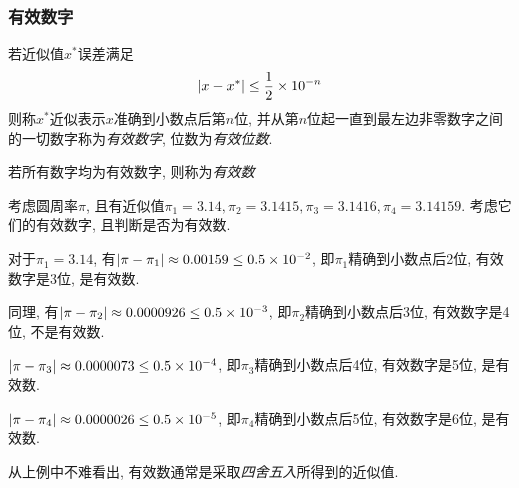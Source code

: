 \subsubsection{有效数字}

\begin{definition}
    若近似值$x^*$误差满足
    \begin{equation*}
        \abs{x-x^*}\le\frac{1}{2}\times10^{-n}
    \end{equation*}
    则称$x^*$近似表示$x$准确到小数点后第$n$位, 并从第$n$位起一直到最左边非零数字之间的一切数字称为\emph{有效数字}, 位数为\emph{有效位数}.

    若所有数字均为有效数字, 则称为\emph{有效数}
\end{definition}

\begin{example}
    考虑圆周率$\pi$, 且有近似值$\pi_1=3.14, \pi_2=3.1415, \pi_3=3.1416, \pi_4=3.14159$. 考虑它们的有效数字, 且判断是否为有效数.
\end{example}

\begin{solution}
    对于$\pi_1=3.14$, 有$\abs{\pi-\pi_1}\approx0.00159\le0.5\times10^{-2}$, 即$\pi_1$精确到小数点后2位, 有效数字是3位, 是有效数.

    同理, 有$\abs{\pi-\pi_2}\approx0.0000926\le0.5\times10^{-3}$, 即$\pi_2$精确到小数点后3位, 有效数字是4位, 不是有效数.

    $\abs{\pi-\pi_3}\approx0.0000073\le0.5\times10^{-4}$, 即$\pi_3$精确到小数点后4位, 有效数字是5位, 是有效数.

    $\abs{\pi-\pi_4}\approx0.0000026\le0.5\times10^{-5}$, 即$\pi_4$精确到小数点后5位, 有效数字是6位, 是有效数.
\end{solution}

从上例中不难看出, 有效数通常是采取\emph{四舍五入}所得到的近似值.

